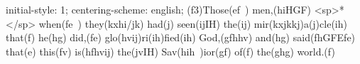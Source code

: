 initial-style: 1;
centering-scheme: english;
(f3)Those(ef~) men,(hiHGF) <sp>*</sp> when(fe~) they(kxhi/jk) had(j) seen(ijIH) the(ij) mir(kxjkkj)a(j)cle(ih) that(f) he(hg) did,(fe) glo(hvij)ri(ih)fied(ih) God,(gfhhv) and(hg) said(fhGFEfe) that(e) this(fv) is(hfhvij) the(jvIH) Sav(hih~)ior(gf) of(f) the(ghg) world.(f)
